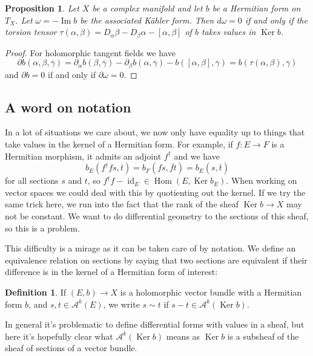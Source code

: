 \documentclass[10pt,a4paper]{amsart}
\newtheorem{prop}[theo]{Proposition}
\theoremstyle{definition}
\newtheorem{defi}[theo]{Definition}
\newcommand{\cc}[1]{\mathcal{#1}}
\def\ov#1{\overline{#1}}
\DeclareMathOperator{\Ker}{Ker}
\DeclareMathOperator{\Hom}{Hom}
\DeclareMathOperator{\id}{id}
\begin{document}
\begin{prop}
Let $X$ be a complex manifold and let $b$ be a Hermitian form on $T_X$.
Let $\omega = -\operatorname{Im} b$ be the associated K\"ahler form.
Then $d \omega = 0$ if and only if the torsion tensor $\tau(\alpha,\beta) = D_\alpha \beta - D_\beta \alpha - [\alpha, \beta]$ of $b$ takes values in $\Ker b$.
\end{prop}

\begin{proof}
For holomorphic tangent fields we have
\[
\partial b (\alpha, \beta, \ov \gamma)
= \partial_\alpha b(\beta, \ov\gamma)
- \partial_\beta b(\alpha, \ov\gamma)
- b([\alpha,\beta], \ov\gamma)
= b(\tau(\alpha,\beta), \ov\gamma)
\]
and $\partial b = 0$ if and only if $\partial \omega = 0$.
\end{proof}



\subsection*{A word on notation}


In a lot of situations we care about, we now only have equality up to things that take values in the kernel of a Hermitian form. For example, if $f : E \to F$ is a Hermitian morphism, it admits an adjoint $f^\dagger$ and we have
\[
b_E(f^\dagger f s, \ov t)
= b_F(f s, \ov{f t})
= b_E(s, \ov t)
\]
for all sections $s$ and $t$,
so $f^\dagger f - \id_E \in \Hom(E, \Ker b_E)$. When working on vector spaces we could deal with this by quotienting out the kernel. If we try the same trick here, we run into the fact that the rank of the sheaf $\Ker b \to X$ may not be constant. We want to do differential geometry to the sections of this sheaf, so this is a problem.

This difficulty is a mirage as it can be taken care of by notation. We define an equivalence relation on sections by saying that two sections are equivalent if their difference is in the kernel of a Hermitian form of interest:


\begin{defi}
If $(E, b) \to X$ is a holomorphic vector bundle with a Hermitian form $b$, and $s, t \in \cc A^k(E)$, we write
\(
s \sim t
\)
if $s - t \in \cc A^k(\Ker b)$.
\end{defi}

In general it's problematic to define differential forms with values in a sheaf, but here it's hopefully clear what $\cc A^k(\Ker b)$ means as $\Ker b$ is a subsheaf of the sheaf of sections of a vector bundle.
\end{document}
